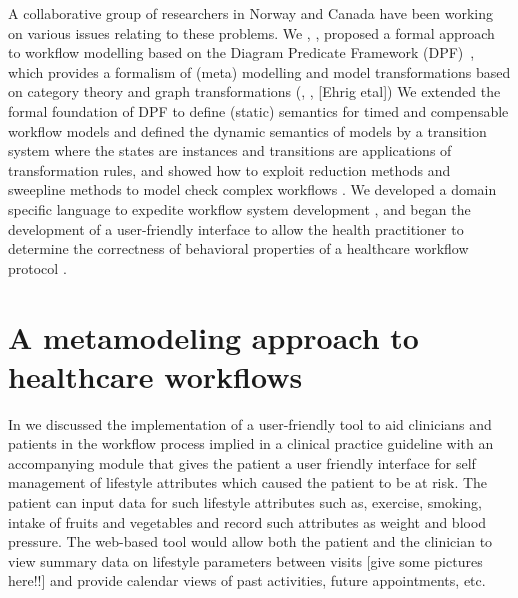 \documentclass[a4paper]{llncs}
\begin{document}
A collaborative group of researchers in Norway and Canada have been working on various issues relating to these problems.  We \cite{RutleWMFHIES12}, \cite{RutleMacCaullEtAl2012ECMFA}, \cite{lamo2011dpf}
proposed a formal approach to workflow 
modelling based on the Diagram Predicate Framework (DPF)~\cite{Rutle10}, \cite{RutleRLW12} which provides a formalism of (meta) modelling and model transformations based on category theory and graph 
transformations (\cite{Barr05}, \cite{DiskinW08}, [Ehrig etal]) We \cite{WangRutleEtAl2012TASE} extended the formal foundation of DPF to define (static) semantics for timed and compensable workflow models and 
defined the dynamic 
semantics of models by a transition system where the states are instances and transitions are applications of transformation rules, and showed how to exploit reduction methods and 
sweepline methods to model check complex workflows \cite{NWPT13}. We developed a domain specific language to expedite workflow system development \cite{FazleMacCaull2012MODELS}, \cite{RabbiM12} 
and began the development of a 
user-friendly interface to allow the health practitioner to determine the correctness of behavioral properties of a healthcare workflow protocol \cite{Rutle2013317}.  




\section{A metamodeling approach to healthcare workflows}

In \cite{CBMS14} we discussed the implementation of a user-friendly tool to aid clinicians and patients in the workflow process implied in a clinical practice guideline with an accompanying 
module that gives the patient a user friendly interface for self management of lifestyle attributes which caused the patient to be at risk.  The patient can input data for such lifestyle 
attributes such as, exercise, smoking, intake of fruits and vegetables and record such attributes as weight and blood pressure.  The web-based tool would allow both the patient and the 
clinician to view summary data on lifestyle parameters between visits [give some pictures here!!] and provide calendar views of past activities, future appointments, etc. 
\end{document}
